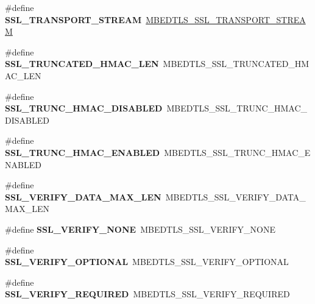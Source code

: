 \begin{DoxyCompactItemize}
\#define {\bfseries S\+S\+L\+\_\+\+T\+R\+A\+N\+S\+P\+O\+R\+T\+\_\+\+S\+T\+R\+E\+AM}~\mbox{\hyperlink{ssl_8h_acf690cf4772ff3e2df4b8295275e6fc7}{M\+B\+E\+D\+T\+L\+S\+\_\+\+S\+S\+L\+\_\+\+T\+R\+A\+N\+S\+P\+O\+R\+T\+\_\+\+S\+T\+R\+E\+AM}}
\item 
\mbox{\label{compat-1_83_8h_a36c288429758bd90fbfa891089d984ff}} 
\#define {\bfseries S\+S\+L\+\_\+\+T\+R\+U\+N\+C\+A\+T\+E\+D\+\_\+\+H\+M\+A\+C\+\_\+\+L\+EN}~M\+B\+E\+D\+T\+L\+S\+\_\+\+S\+S\+L\+\_\+\+T\+R\+U\+N\+C\+A\+T\+E\+D\+\_\+\+H\+M\+A\+C\+\_\+\+L\+EN
\item 
\mbox{\label{compat-1_83_8h_a3fc505cdd77f24a0b3b509376abae77f}} 
\#define {\bfseries S\+S\+L\+\_\+\+T\+R\+U\+N\+C\+\_\+\+H\+M\+A\+C\+\_\+\+D\+I\+S\+A\+B\+L\+ED}~M\+B\+E\+D\+T\+L\+S\+\_\+\+S\+S\+L\+\_\+\+T\+R\+U\+N\+C\+\_\+\+H\+M\+A\+C\+\_\+\+D\+I\+S\+A\+B\+L\+ED
\item 
\mbox{\label{compat-1_83_8h_a8f0eeff6804fb62e9eed7fc94f751efe}} 
\#define {\bfseries S\+S\+L\+\_\+\+T\+R\+U\+N\+C\+\_\+\+H\+M\+A\+C\+\_\+\+E\+N\+A\+B\+L\+ED}~M\+B\+E\+D\+T\+L\+S\+\_\+\+S\+S\+L\+\_\+\+T\+R\+U\+N\+C\+\_\+\+H\+M\+A\+C\+\_\+\+E\+N\+A\+B\+L\+ED
\item 
\mbox{\label{compat-1_83_8h_ab5e0465928755ad79990548cbc688c41}} 
\#define {\bfseries S\+S\+L\+\_\+\+V\+E\+R\+I\+F\+Y\+\_\+\+D\+A\+T\+A\+\_\+\+M\+A\+X\+\_\+\+L\+EN}~M\+B\+E\+D\+T\+L\+S\+\_\+\+S\+S\+L\+\_\+\+V\+E\+R\+I\+F\+Y\+\_\+\+D\+A\+T\+A\+\_\+\+M\+A\+X\+\_\+\+L\+EN
\item 
\mbox{\label{compat-1_83_8h_a060b51dc564d4b9dc941e81eab66d60c}} 
\#define {\bfseries S\+S\+L\+\_\+\+V\+E\+R\+I\+F\+Y\+\_\+\+N\+O\+NE}~M\+B\+E\+D\+T\+L\+S\+\_\+\+S\+S\+L\+\_\+\+V\+E\+R\+I\+F\+Y\+\_\+\+N\+O\+NE
\item 
\mbox{\label{compat-1_83_8h_a7760ecdb03ee6f4520a21c04942c0883}} 
\#define {\bfseries S\+S\+L\+\_\+\+V\+E\+R\+I\+F\+Y\+\_\+\+O\+P\+T\+I\+O\+N\+AL}~M\+B\+E\+D\+T\+L\+S\+\_\+\+S\+S\+L\+\_\+\+V\+E\+R\+I\+F\+Y\+\_\+\+O\+P\+T\+I\+O\+N\+AL
\item 
\mbox{\label{compat-1_83_8h_a1f9549da00fa29209b3db3c5f11a329b}} 
\#define {\bfseries S\+S\+L\+\_\+\+V\+E\+R\+I\+F\+Y\+\_\+\+R\+E\+Q\+U\+I\+R\+ED}~M\+B\+E\+D\+T\+L\+S\+\_\+\+S\+S\+L\+\_\+\+V\+E\+R\+I\+F\+Y\+\_\+\+R\+E\+Q\+U\+I\+R\+ED

\end{DoxyCompactItemize}
